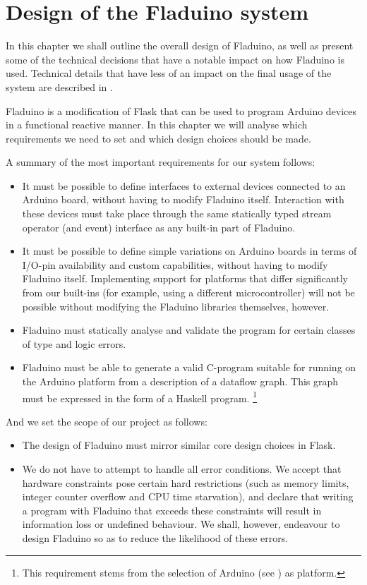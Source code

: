 \documentclass[a4paper, oneside, final]{memoir}
\let\fref\undefined
\begin{document}
\chapter{Design of the Fladuino system}
\label{chap:design}

In this chapter we shall outline the overall design of Fladuino, as
well as present some of the technical decisions that have a notable
impact on how Fladuino is used.  Technical details that have less of
an impact on the final usage of the system are described in
\fref{chap:implementation}.

Fladuino is a modification of Flask that can be used to program
Arduino devices in a functional reactive manner. In this chapter we
will analyse which requirements we need to set and which design
choices should be made.

A summary of the most important requirements for our system follows:

\begin{itemize}
\item It must be possible to define interfaces to external devices
  connected to an Arduino board, without having to modify Fladuino
  itself.  Interaction with these devices must take place through the
  same statically typed stream operator (and event) interface as any
  built-in part of Fladuino.
\item It must be possible to define simple variations on Arduino
  boards in terms of I/O-pin availability and custom capabilities,
  without having to modify Fladuino itself.  Implementing support for
  platforms that differ significantly from our built-ins (for example,
  using a different microcontroller) will not be possible without
  modifying the Fladuino libraries themselves, however.
\item Fladuino must statically analyse and validate the program for
  certain classes of type and logic errors.
\item Fladuino must be able to generate a valid C-program suitable for
  running on the Arduino platform from a description of a dataflow graph. This
  graph must be expressed in the form of a Haskell program.
  \footnote{This requirement stems from the selection of
    Arduino (see \fref{sec:hardware platform}) as platform.}
\end{itemize}

And we set the scope of our project as follows:
\begin{itemize}
\item The design of Fladuino must mirror similar core design choices
  in Flask.
\item We do not have to attempt to handle all error conditions.  We
  accept that hardware constraints pose certain hard restrictions
  (such as memory limits, integer counter overflow and CPU time
  starvation), and declare that writing a program with Fladuino that
  exceeds these constraints will result in information loss or
  undefined behaviour.  We shall, however, endeavour to design
  Fladuino so as to reduce the likelihood of these errors.
\end{itemize}
\end{document}

